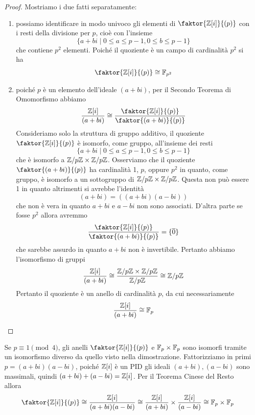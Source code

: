 \documentclass[11pt]{scrartcl}
\begin{document}
	\begin{proof} 
		Mostriamo i due fatti separatamente:
		\begin{enumerate}[(1)]
			\item possiamo identificare in modo univoco gli elementi di 
			$\faktor{\ZZ[i]}{(p)}$ con i resti della divisione per $p$, cioè
			con l'insieme 
			\[
			\{a + bi \mid 0 \leq a \leq p - 1, 0 \leq b \leq p - 1\}
			\]
			che contiene $p^2$ elementi. Poiché il quoziente è un campo di cardinalità
			$p^2$ si ha
			\[
			\faktor{\ZZ[i]}{(p)}\cong \FF_{p^2}
			\]
			\item poiché $p$ è un elemento dell'ideale $(a + bi)$, per il 
			Secondo Teorema di Omomorfismo abbiamo 
			\[
			\frac{\ZZ[i]}{(a + bi)} \cong \frac{\faktor{\ZZ[i]}{(p)}}{\faktor{(a + bi)}{(p)}}
			\]
			Consideriamo solo la struttura di gruppo additivo, il quoziente 
			$\faktor{\ZZ[i]}{(p)}$ è isomorfo, come gruppo, all'insieme
			dei resti 
			\[
			\{a + bi \mid 0\leq a\leq p - 1, 0\leq b\leq p -1\}
			\]
			che è isomorfo a ${\mathbb Z}/p{\mathbb Z}\times{\mathbb Z}/p{\mathbb Z}$. Osserviamo che il quoziente
			$\faktor{(a + bi)}{(p)}$ ha cardinalità 1, $p$, oppure $p^2$ in quanto,
			come gruppo, è isomorfo a un sottogruppo di ${\mathbb Z}/p{\mathbb Z}\times{\mathbb Z}/p{\mathbb Z}$. Questa 
			non può essere 1 in quanto altrimenti si avrebbe l'identità
			\[
			(a + bi) = ((a + bi)(a - bi))
			\]
			che non è vera in quanto $a + bi$ e $a - bi$ non sono associati. D'altra 
			parte se fosse $p^2$ allora avremmo
			\[
			\frac{\faktor{\ZZ[i]}{(p)}}{\faktor{(a + bi)}{(p)}} = \{\overline{0}\}
			\]
			che sarebbe assurdo in quanto $a + bi$ non è invertibile. Pertanto 
			abbiamo l'isomorfismo di gruppi
			\[
			\frac{\mathbb Z[i]}{(a + bi)} \cong \frac{{\mathbb Z}/p{\mathbb Z} \times {\mathbb Z}/p{\mathbb Z}}{{\mathbb Z}/p{\mathbb Z}} \cong {\mathbb Z}/p{\mathbb Z}
			\]
			Pertanto il quoziente è un anello di cardinalità $p$, da cui necessariamente
			\[
			\frac{\mathbb Z[i]}{(a + bi)} \cong \mathbb F_p
			\]
		\end{enumerate}
	\end{proof}
	
	\begin{remark}
		Se $p \equiv 1 \pmod 4$, gli anelli $\faktor{\ZZ[i]}{(p)}$ e $\mathbb F_p \times \mathbb F_p$
		sono isomorfi tramite un isomorfismo diverso da quello visto nella dimostrazione.
		Fattorizziamo in primi $p = (a + bi)(a - bi)$, poiché $\mathbb Z[i]$ è un PID
		gli ideali $(a + bi), (a - bi)$ sono massimali, quindi $(a + bi) + (a - bi) = \mathbb Z[i]$.
		Per il Teorema Cinese del Resto allora
		\[
		\faktor{\ZZ[i]}{(p)} \cong \frac{\ZZ[i]}{(a + bi)(a - bi)} \cong
		\frac{\ZZ[i]}{(a + bi)} \times \frac{\ZZ[i]}{(a - bi)} \cong \FF_p \times \FF_p
		\]
	\end{remark}
	
\end{document}
